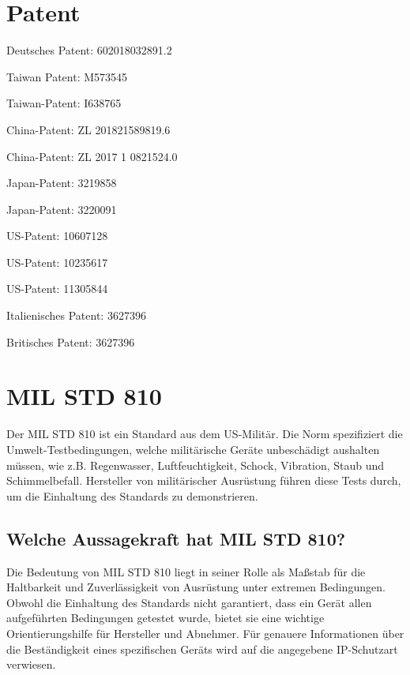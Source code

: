 \section{Patent}
\begin{itemize}{
		\item Deutsches Patent:		602018032891.2
		\item Taiwan Patent: 		M573545
		\item Taiwan-Patent:		I638765
		\item China-Patent:			ZL 201821589819.6
		\item China-Patent:			ZL 2017 1 0821524.0
		\item Japan-Patent:			3219858
		\item Japan-Patent:			3220091
		\item US-Patent:			10607128
		\item US-Patent:			10235617
		\item US-Patent:			11305844
		\item Italienisches Patent:	3627396
		\item Britisches Patent:	3627396
		
}\end{itemize}

\section{MIL STD 810}

Der MIL STD 810 ist ein Standard aus dem US-Militär. Die Norm spezifiziert die Umwelt-Testbedingungen, welche militärische Geräte unbeschädigt aushalten müssen, wie z.B. Regenwasser, Luftfeuchtigkeit, Schock, Vibration, Staub und Schimmelbefall. Hersteller von militärischer Ausrüstung führen diese Tests durch, um die Einhaltung des Standards zu demonstrieren. %

\subsection{Welche Aussagekraft hat MIL STD 810?}

Die Bedeutung von MIL STD 810 liegt in seiner Rolle als Maßstab für die Haltbarkeit und Zuverlässigkeit von Ausrüstung unter extremen Bedingungen. Obwohl die Einhaltung des Standards nicht garantiert, dass ein Gerät allen aufgeführten Bedingungen getestet wurde, bietet sie eine wichtige Orientierungshilfe für Hersteller und Abnehmer. Für genauere Informationen über die Beständigkeit eines spezifischen Geräts wird auf die angegebene IP-Schutzart verwiesen.

